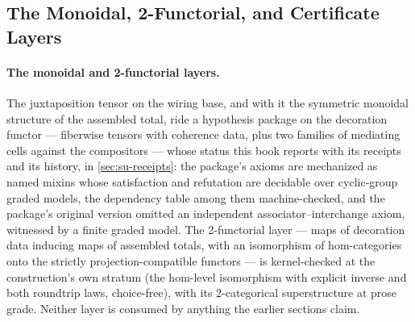 \subsection{The Monoidal, 2-Functorial, and Certificate Layers}

\paragraph{The monoidal and 2-functorial layers.} The juxtaposition
tensor on the wiring base, and with it the symmetric monoidal
structure of the assembled total, ride a hypothesis package on the
decoration functor --- fiberwise tensors with coherence data, plus
two families of mediating cells against the compositors --- whose
status this book reports with its receipts and its history, in
\autoref{sec:su-receipts}: the package's axioms are mechanized
as named mixins whose satisfaction and refutation are decidable
over cyclic-group graded models, the dependency table among them
machine-checked, and the package's original version omitted an
independent associator--interchange axiom, witnessed by a finite
graded model. The
2-functorial layer --- maps of decoration data inducing maps of
assembled totals, with an isomorphism of hom-categories onto the
strictly projection-compatible functors --- is kernel-checked at
the construction's own stratum (the hom-level isomorphism with explicit
inverse and both roundtrip laws, choice-free), with its
2-categorical superstructure at prose grade. Neither layer is
consumed by anything the earlier sections claim.

